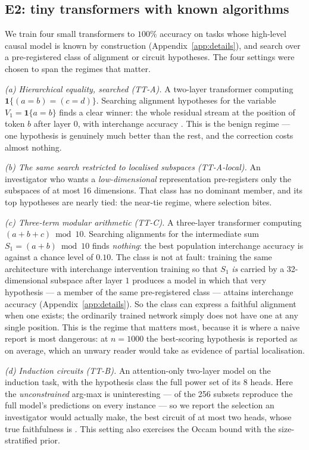 \subsection{E2: tiny transformers with known algorithms}
\label{sec:e2}

We train four small transformers to $100\%$ accuracy on tasks whose high-level
causal model is known by construction (Appendix~\ref{app:details}), and search
over a pre-registered class of alignment or circuit hypotheses. The four settings
were chosen to span the regimes that matter.

\emph{(a) Hierarchical equality, searched (TT-A).} A two-layer transformer
computing $\mathbf{1}\{(a{=}b)=(c{=}d)\}$. Searching \Myttam{} alignment
hypotheses for the variable $V_1=\mathbf{1}\{a{=}b\}$ finds a clear winner: the
whole residual stream at the position of token $b$ after layer $0$, with
interchange accuracy \MyttaThetaBest{}. This is the benign regime --- one
hypothesis is genuinely much better than the rest, and the correction costs
almost nothing.

\emph{(b) The same search restricted to localised subspaces (TT-A-local).} An
investigator who wants a \emph{low-dimensional} representation pre-registers only
the subspaces of at most 16 dimensions. That class has no dominant member, and
its top hypotheses are nearly tied: the near-tie regime, where selection bites.

\emph{(c) Three-term modular arithmetic (TT-C).} A three-layer transformer
computing $(a{+}b{+}c) \bmod 10$. Searching \Myttcm{} alignments for the
intermediate sum $S_1=(a{+}b)\bmod 10$ finds \emph{nothing}: the best population
interchange accuracy is \MyttcThetaBest{} against a chance level of $0.10$. The class is not
at fault: training the same architecture with interchange intervention training
so that $S_1$ \emph{is} carried by a 32-dimensional subspace after layer $1$
produces a model in which that very hypothesis --- a member of the same
pre-registered class --- attains interchange accuracy \MyttciitTheta{}
(Appendix~\ref{app:details}). So the class can express a faithful alignment when
one exists; the ordinarily trained network simply does not have one at any single
position. This is the regime that matters most, because it is where a naive
report is most dangerous: at $n=1000$ the best-scoring hypothesis is reported as
\MyttcNaivePoint{} on average, which an unwary reader would take as evidence of
partial localisation.

\emph{(d) Induction circuits (TT-B).} An attention-only two-layer model on the
induction task, with the hypothesis class the full power set of its $8$ heads.
Here the \emph{unconstrained} arg-max is uninteresting --- \MyttbPerfect{} of the
256 subsets reproduce the full model's predictions on every instance --- so we
report the selection an investigator would actually make, the best circuit of at
most two heads, whose true faithfulness is \MyttbThetaBest{}. This setting also
exercises the Occam bound with the size-stratified prior.

